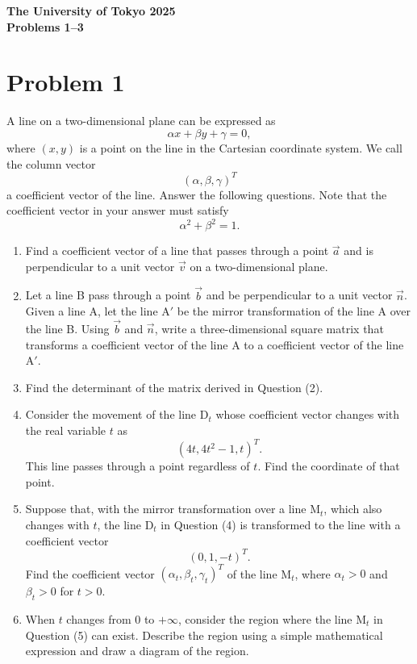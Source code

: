 \documentclass[10pt,a4paper]{article}
\begin{document}
\begin{center}
  {\Large \textbf{The University of Tokyo 2025}}\\[2mm]
  {\large \textbf{Problems 1--3}}
\end{center}

\section*{Problem 1}

A line on a two-dimensional plane can be expressed as
\[
  \alpha x+\beta y+\gamma=0,
\]
where $(x,y)$ is a point on the line in the Cartesian coordinate system. We call the column vector
\[
  (\alpha,\beta,\gamma)^T
\]
a coefficient vector of the line. Answer the following questions. Note that the coefficient vector in your answer must satisfy
\[
  \alpha^2+\beta^2=1.
\]

\begin{enumerate}
  \item Find a coefficient vector of a line that passes through a point $\vec{a}$ and is perpendicular to a unit vector $\vec{v}$ on a two-dimensional plane.

  \item Let a line B pass through a point $\vec{b}$ and be perpendicular to a unit vector $\vec{n}$. Given a line A, let the line A$'$ be the mirror transformation of the line A over the line B. Using $\vec{b}$ and $\vec{n}$, write a three-dimensional square matrix that transforms a coefficient vector of the line A to a coefficient vector of the line A$'$.

  \item Find the determinant of the matrix derived in Question (2).

  \item Consider the movement of the line D$_t$ whose coefficient vector changes with the real variable $t$ as
        \[
          (4t,4t^2-1,t)^T.
        \]
        This line passes through a point regardless of $t$. Find the coordinate of that point.

  \item Suppose that, with the mirror transformation over a line M$_t$, which also changes with $t$, the line D$_t$ in Question (4) is transformed to the line with a coefficient vector
        \[
          (0,1,-t)^T.
        \]
        Find the coefficient vector $(\alpha_t,\beta_t,\gamma_t)^T$ of the line M$_t$, where $\alpha_t>0$ and $\beta_t>0$ for $t>0$.

  \item When $t$ changes from $0$ to $+\infty$, consider the region where the line M$_t$ in Question (5) can exist. Describe the region using a simple mathematical expression and draw a diagram of the region.
\end{enumerate}
\end{document}
